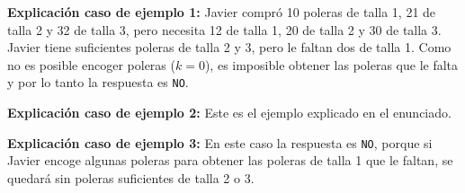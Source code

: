 \documentclass{oci}
\begin{document}
\begin{sampleDescription}
\begin{center}
    \begin{minipage}{0.94\textwidth}
    \textbf{Explicación caso de ejemplo 1:} Javier compró 10 poleras de talla 1, 21 de talla 2 y 32 de talla 3,
    pero necesita 12 de talla 1, 20 de talla 2 y 30 de talla 3.
    Javier tiene suficientes poleras de talla 2 y 3, pero le faltan dos de talla 1.
    Como no es posible encoger poleras ($k=0$), es imposible obtener las poleras que le falta y por
    lo tanto la respuesta es \texttt{NO}.
    \end{minipage}
\end{center}

\begin{center}
    \begin{minipage}{0.94\textwidth}
    \textbf{Explicación caso de ejemplo 2:} Este es el ejemplo explicado en el enunciado.
    \end{minipage}
\end{center}

\begin{center}
    \begin{minipage}{0.94\textwidth}
    \textbf{Explicación caso de ejemplo 3:} En este caso la respuesta es \texttt{NO}, porque si Javier
    encoge algunas poleras para obtener las poleras de talla 1 que le faltan, se quedará sin poleras
    suficientes de talla 2 o 3.
    \end{minipage}
\end{center}
\end{sampleDescription}
\end{document}
